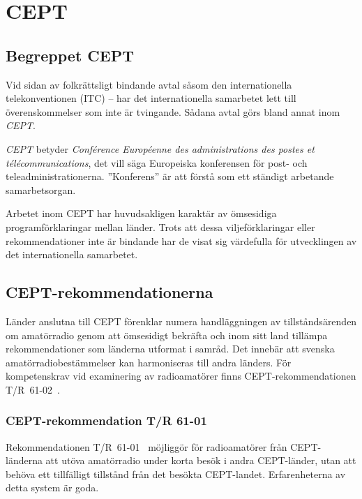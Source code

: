 \newpage
\section{CEPT}
\label{sec:CEPT}

\subsection{Begreppet CEPT}

Vid sidan av folkrättsligt bindande avtal såsom den internationella
telekonventionen (ITC) -- har det internationella samarbetet lett till
överenskommelser som inte är tvingande.
Sådana avtal görs bland annat inom \emph{CEPT}.

\emph{CEPT} betyder \emph{Conf\'erence Europ\'eenne des administrations des
postes et t\'el\'ecommunications}, det vill säga Europeiska konferensen för
post- och teleadministrationerna.
''Konferens'' är att förstå som ett ständigt arbetande samarbetsorgan.

Arbetet inom CEPT har huvudsakligen karaktär av ömsesidiga programförklaringar
mellan länder.
Trots att dessa viljeförklaringar eller rekommendationer inte är bindande har de
visat sig värdefulla för utvecklingen av det internationella samarbetet.

\subsection{CEPT-rekommendationerna}

Länder anslutna till CEPT förenklar numera handläggningen av
tillståndsärenden om amatörradio genom att ömsesidigt bekräfta och
inom sitt land tillämpa rekommendationer som länderna utformat i
samråd.
Det innebär att svenska amatörradiobestämmelser kan harmoniseras till andra
länders.
För kompetenskrav vid examinering av radioamatörer finns CEPT-rekommendationen
T/R~61-02~\cite{TR6102}.

\subsubsection{CEPT-rekommendation T/R 61-01}

Rekommendationen T/R~61-01~\cite{TR6101} möjliggör för radioamatörer från
CEPT-länderna att utöva amatörradio under korta besök i andra CEPT-länder, utan
att behöva ett tillfälligt tillstånd från det besökta CEPT-landet.
Erfarenheterna av detta system är goda.

